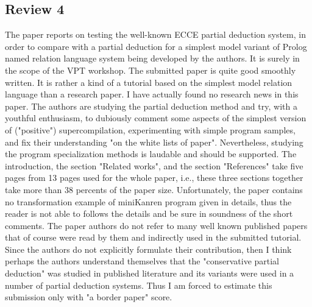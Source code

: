 
\subsection*{Review 4}

The paper reports on testing the well-known ECCE partial deduction system, in order to compare with a partial deduction for a simplest model variant of Prolog named relation language system being developed by the authors.
It is surely in the scope of the VPT workshop.
The submitted paper is quite good smoothly written. It is rather a kind of a tutorial based on the simplest model relation language than a research paper. I have actually found no research news in this paper. The authors are studying the partial deduction method and try, with a youthful enthusiasm, to dubiously comment some aspects of the simplest version of ("positive") supercompilation, experimenting with simple program samples, and fix their understanding "on the white lists of paper". Nevertheless, studying the program specialization methods is laudable and should be supported.
The introduction, the section "Related works", and the section "References" take five pages from 13 pages used for the whole paper, i.e., these three sections together take more than 38 percents of the paper size.
Unfortunately, the paper contains no transformation example of miniKanren program given in details, thus the reader is not able to follows the details and be sure in soundness of the short comments.
The paper authors do not refer to many well known published papers that of course were read by them and indirectly used in the submitted tutorial. Since the authors do not explicitly formulate their contribution, then I think perhaps the authors understand themselves that the "conservative partial deduction" was studied in published literature and its variants were used in a number of partial deduction systems.
Thus I am forced to estimate this submission only with "a border paper" score.


